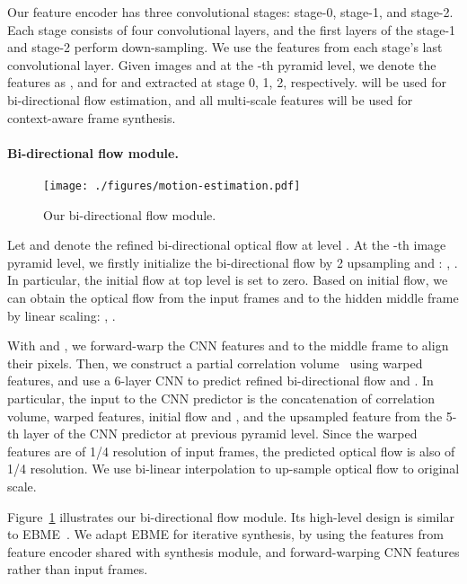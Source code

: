 \documentclass[10pt,twocolumn,letterpaper]{article}
\begin{document}
Our feature encoder has three convolutional stages: stage-0, stage-1, and
stage-2. Each stage consists of four convolutional layers, and the first layers
of the stage-1 and stage-2 perform down-sampling. We use the features from each
stage's last convolutional layer. Given images  and  at the -th
pyramid level, we denote the features as ,
 and  for  and 
extracted at stage 0, 1, 2, respectively.  will be
used for bi-directional flow estimation, and all multi-scale features will be
used for context-aware frame synthesis.


\paragraph{Bi-directional flow module.}

\begin{figure}[tb]
\centering
\texttt{[image: ./figures/motion-estimation.pdf]}
\caption{Our bi-directional flow module.}
\vspace{-0.2cm}
\label{fig:flow-module}
\end{figure}


Let  and  denote the
refined bi-directional optical flow at level .  At the -th image pyramid
level, we firstly initialize the bi-directional flow by 2 upsampling
 and : , .  In particular,
the initial flow at top level is set to zero.  Based on initial flow, we can
obtain the optical flow from the input frames  and  to the hidden
middle frame  by linear scaling: , .  



With  and , we
forward-warp the CNN features  and  to the middle frame to
align their pixels. Then, we construct a partial correlation
volume~\cite{sun2018pwc} using warped features,
and use a 6-layer CNN to predict refined bi-directional flow  and .  In particular, the input to the
CNN predictor is the concatenation of correlation volume, warped features,
initial flow  and ,
and the upsampled feature from the 5-th layer of the CNN predictor at previous
pyramid level. Since the warped features are of 1/4 resolution of input frames,
the predicted optical flow is also of 1/4 resolution.  We use bi-linear
interpolation to up-sample optical flow to original scale.



Figure~\ref{fig:flow-module} illustrates our bi-directional flow module. Its
high-level design is similar to EBME~\cite{jin2022enhanced}. We adapt EBME for
iterative synthesis, by using the features from feature encoder shared with
synthesis module, and forward-warping CNN features rather than input frames.
\end{document}
